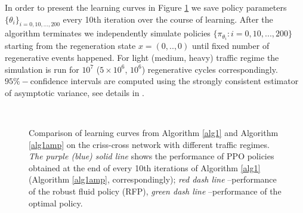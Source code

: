 \documentclass[11pt]{article}
\theoremstyle{definition}
\numberwithin{equation}{section}
\begin{document}
In order to present the learning curves in Figure \ref{fig:cc_opt}  we  save policy parameters $\{\theta_i\}_{i=0, 10, ..., 200}$ every 10th iteration over the course of learning. After the algorithm terminates we independently 
 simulate   policies $\{    \pi_{\theta_i}: i = 0, 10, ..., 200 \}$  starting from the regeneration state $x = (0,..,0)$ until fixed number of regenerative events happened. For light (medium, heavy)  traffic regime the simulation is run for $10^7$ ($5\times 10^6$, $10^6$) regenerative cycles correspondingly. 
  $95\%-$confidence intervals   are computed using the strongly consistent estimator of asymptotic variance, see details in \cite[Section VI.2d]{Asmussen2003}.


  \begin{figure}[H]
     \\

   


   
     \caption{Comparison of learning curves from Algorithm \ref{alg1} and Algorithm \ref{alg1amp}  on the criss-cross network with different traffic regimes.  \textit{The purple (blue) solid line} shows the performance of  PPO policies obtained at the end of every 10th iterations of Algorithm \ref{alg1} (Algorithm \ref{alg1amp}, correspondingly);  \textit{red dash line} --performance of the robust fluid policy (RFP), \textit{green dash line} --performance of the optimal policy. }
     \label{fig:cc_opt}
   \end{figure}
\end{document}
